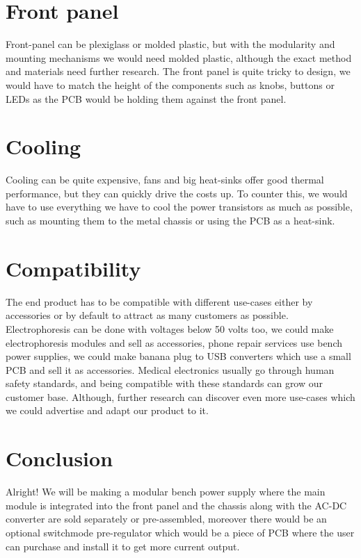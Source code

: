\documentclass[a4paper, twocolumn]{article}
\begin{document}
\section{Front panel}
	Front-panel can be plexiglass or molded plastic, but with the modularity and mounting mechanisms we would need molded plastic, although the exact method and materials need further research. The front panel is quite tricky to design, we would have to match the height of the components such as knobs, buttons or LEDs as the PCB would be holding them against the front panel. 
\section{Cooling}
	Cooling can be quite expensive, fans and big heat-sinks offer good thermal performance, but they can quickly drive the costs up. To counter this, we would have to use everything we have to cool the power transistors as much as possible, such as mounting them to the metal chassis or using the PCB as a heat-sink.

\section*{Compatibility}
	The end product has to be compatible with different use-cases either by accessories or by default to attract as many customers as possible. Electrophoresis can be done with voltages below 50 volts too, we could make electrophoresis modules and sell as accessories, phone repair services use bench power supplies, we could make banana plug to USB converters which use a small PCB and sell it as accessories. Medical electronics usually go through human safety standards, and being compatible with these standards can grow our customer base. Although, further research can discover even more use-cases which we could advertise and adapt our product to it.

\section*{Conclusion}
	Alright! We will be making a modular bench power supply where the main module is integrated into the front panel and the chassis along with the AC-DC converter are sold separately or pre-assembled, moreover there would be an optional switchmode pre-regulator which would be a piece of PCB where the user can purchase and install it to get more current output.
\end{document}
